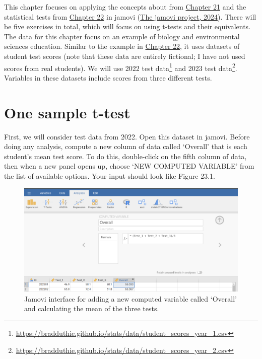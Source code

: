 \documentclass[
  openany]{krantz}
\begin{document}
This chapter focuses on applying the concepts about  from \protect\hyperlink{Chapter_21}{Chapter 21} and the statistical tests from \protect\hyperlink{Chapter_22}{Chapter 22} in jamovi (\protect\hyperlink{ref-Jamovi2022}{The jamovi project, 2024}).
There will be five exercises in total, which will focus on using t-tests and their  equivalents.
The data for this chapter focus on an example of biology and environmental sciences education.
Similar to the example in \protect\hyperlink{Chapter_22}{Chapter 22}, it uses datasets of student test scores (note that these data are entirely fictional; I have not used scores from real students).
We will use 2022 test data\footnote{\url{https://bradduthie.github.io/stats/data/student_scores_year_1.csv}} and 2023 test data\footnote{\url{https://bradduthie.github.io/stats/data/student_scores_year_2.csv}}.
Variables in these datasets include scores from three different tests.

\hypertarget{one-sample-t-test-1}{%
\section{One sample t-test}\label{one-sample-t-test-1}}

First, we will consider test data from 2022.
Open this dataset in jamovi.
Before doing any analysis, compute a new column of data called `Overall' that is each student's mean test score.
To do this, double-click on the fifth column of data, then when a new panel opens up, choose `NEW COMPUTED VARIABLE' from the list of available options.
Your input should look like Figure 23.1.

\begin{figure}
\includegraphics[width=1\linewidth]{img/jamovi_students_overall} \caption{Jamovi interface for adding a new computed variable called `Overall' and calculating the mean of the three tests.}\label{fig:unnamed-chunk-90}
\end{figure}
\end{document}
